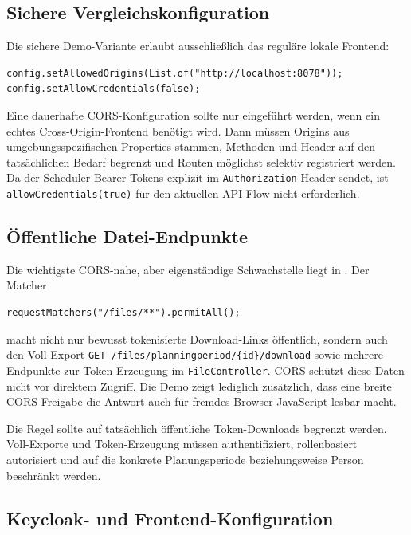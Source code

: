 \subsection{Sichere Vergleichskonfiguration}

Die sichere Demo-Variante erlaubt ausschließlich das reguläre lokale Frontend:

\begin{lstlisting}[caption={Restriktive lokale Vergleichskonfiguration}]
config.setAllowedOrigins(List.of("http://localhost:8078"));
config.setAllowCredentials(false);
\end{lstlisting}

Eine dauerhafte CORS-Konfiguration sollte nur eingeführt werden, wenn
ein echtes Cross-Origin-Frontend benötigt wird. Dann müssen Origins
aus umgebungsspezifischen Properties stammen, Methoden und Header auf
den tatsächlichen Bedarf begrenzt und Routen möglichst selektiv
registriert werden. Da der Scheduler Bearer-Tokens explizit im
\texttt{Authorization}-Header sendet, ist
\texttt{allowCredentials(true)} für den aktuellen API-Flow nicht erforderlich.

\subsection{Öffentliche Datei-Endpunkte}

Die wichtigste CORS-nahe, aber eigenständige Schwachstelle liegt in
.
Der Matcher

\begin{lstlisting}
requestMatchers("/files/**").permitAll();
\end{lstlisting}

macht nicht nur bewusst tokenisierte Download-Links öffentlich,
sondern auch den Voll-Export \texttt{GET
/files/planningperiod/\{id\}/download} sowie mehrere Endpunkte zur
Token-Erzeugung im \texttt{FileController}. CORS schützt diese Daten
nicht vor direktem Zugriff. Die Demo zeigt lediglich zusätzlich, dass
eine breite CORS-Freigabe die Antwort auch für fremdes
Browser-JavaScript lesbar macht.

Die Regel sollte auf tatsächlich öffentliche Token-Downloads begrenzt
werden. Voll-Exporte und Token-Erzeugung müssen authentifiziert,
rollenbasiert autorisiert und auf die konkrete Planungsperiode
beziehungsweise Person beschränkt werden.

\subsection{Keycloak- und Frontend-Konfiguration}


